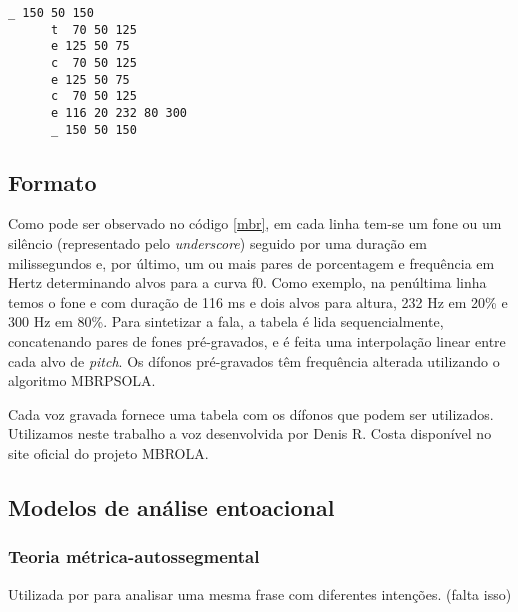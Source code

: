 \begin{lstlisting}[caption=Exemplo de arquivo de entrada para MBROLA, label=mbr]
      _ 150 50 150
      t  70 50 125
      e 125 50 75
      c  70 50 125
      e 125 50 75
      c  70 50 125
      e 116 20 232 80 300
      _ 150 50 150
\end{lstlisting}

\subsection{Formato}
Como pode ser observado no código \ref{mbr}, em cada linha tem-se um fone ou um
silêncio (representado pelo \emph{underscore}) seguido por uma duração em
milissegundos e, por último, um ou mais pares de porcentagem e frequência em
Hertz determinando alvos para a curva f0. Como exemplo, na penúltima linha temos
o fone \/e\/ com duração de 116 ms e dois alvos para altura, 232 Hz em 20\% e
300 Hz em 80\%. Para sintetizar a fala, a tabela é lida sequencialmente,
concatenando pares de fones pré-gravados, e é feita uma interpolação linear
entre cada alvo de \emph{pitch}. Os dífonos pré-gravados têm frequência alterada
utilizando o algoritmo MBRPSOLA.

Cada voz gravada fornece uma tabela com os dífonos que podem ser utilizados. Utilizamos neste trabalho a voz  desenvolvida por Denis R. Costa disponível no site oficial do projeto MBROLA.

\subsection{Modelos de análise entoacional}
\label{entoa}

\subsubsection{Teoria métrica-autossegmental}
Utilizada por  para analisar uma mesma frase com
diferentes intenções. (falta isso)


